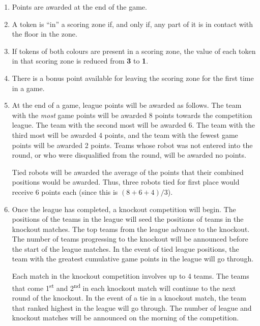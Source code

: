 \begin{enumerate}
\item Points are awarded at the end of the game.

\item A token is ``in'' a scoring zone if, and only if, any part of it is in contact with the floor in the zone.

\item If tokens of both colours are present in a scoring zone, the value of each token in that scoring zone is reduced from \textbf{3} to \textbf{1}.

\item There is a bonus point available for leaving the scoring zone for the first time in a game.

\item At the end of a game, league points will be awarded as follows.
      The team with the \emph{most} game points will be awarded 8 points towards the competition league.
      The team with the second most will be awarded 6.
      The team with the third most will be awarded 4 points, and the team with the fewest game points will be awarded 2 points.
      Teams whose robot was not entered into the round, or who were disqualified from the round, will be awarded no points.

      Tied robots will be awarded the average of the points that their combined positions would be awarded.
      Thus, three robots tied for first place would receive 6 points each (since this is $(8+6+4)/3$).

\item Once the league has completed, a knockout competition will begin.
      The positions of the teams in the league will seed the positions of teams in the knockout matches.
      The top teams from the league advance to the knockout.
      The number of teams progressing to the knockout will be announced before the start of the league matches.
      In the event of tied league positions, the team with the greatest cumulative game points in the league will go through.

      Each match in the knockout competition involves up to 4 teams.
      The teams that come 1\textsuperscript{st} and 2\textsuperscript{nd} in each knockout match will continue to the next round of the knockout.
      In the event of a tie in a knockout match, the team that ranked highest in the league will go through.
      The number of league and knockout matches will be announced on the morning of the competition.

\end{enumerate}
